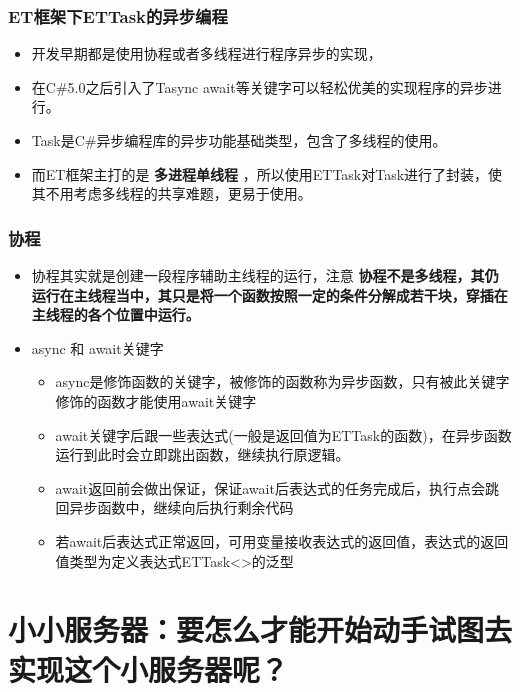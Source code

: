 \documentclass[9pt, b5paper]{article}
\begin{document}
\subsubsection{ET框架下ETTask的异步编程}
\label{sec-1-2-2}
\begin{itemize}
\item 开发早期都是使用协程或者多线程进行程序异步的实现，
\item 在C\#5.0之后引入了Tasync await等关键字可以轻松优美的实现程序的异步进行。
\item Task是C\#异步编程库的异步功能基础类型，包含了多线程的使用。
\item 而ET框架主打的是 \textbf{多进程单线程} ，所以使用ETTask对Task进行了封装，使其不用考虑多线程的共享难题，更易于使用。
\end{itemize}
\subsubsection{协程}
\label{sec-1-2-3}
\begin{itemize}
\item 协程其实就是创建一段程序辅助主线程的运行，注意 \textbf{协程不是多线程，其仍运行在主线程当中，其只是将一个函数按照一定的条件分解成若干块，穿插在主线程的各个位置中运行。}
\item async 和 await关键字
\begin{itemize}
\item async是修饰函数的关键字，被修饰的函数称为异步函数，只有被此关键字修饰的函数才能使用await关键字
\item await关键字后跟一些表达式(一般是返回值为ETTask的函数)，在异步函数运行到此时会立即跳出函数，继续执行原逻辑。
\item await返回前会做出保证，保证await后表达式的任务完成后，执行点会跳回异步函数中，继续向后执行剩余代码
\item 若await后表达式正常返回，可用变量接收表达式的返回值，表达式的返回值类型为定义表达式ETTask<>的泛型
\end{itemize}
\end{itemize}
\section{小小服务器：要怎么才能开始动手试图去实现这个小服务器呢？}
\label{sec-2}
\end{document}
